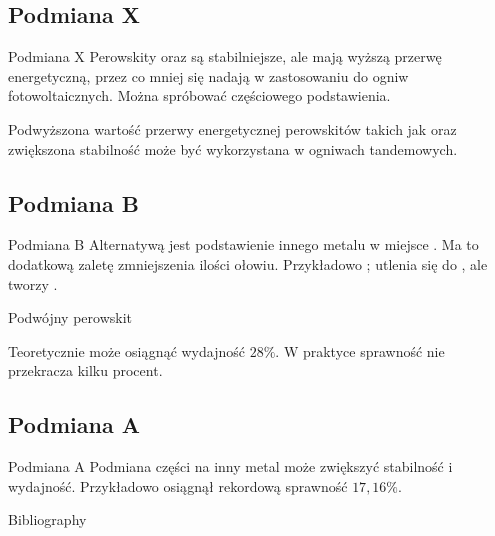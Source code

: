 \documentclass[xcolor]{beamer}
\begin{document}
\subsection{Podmiana X}
\begin{frame}{Podmiana X \cite{miyasaka}}
Perowskity  oraz  są stabilniejsze, ale mają wyższą przerwę energetyczną, przez co mniej się nadają w zastosowaniu do ogniw fotowoltaicznych. Można spróbować częściowego podstawienia.
\begin{center}
\end{center}
Podwyższona wartość przerwy energetycznej perowskitów takich jak  oraz zwiększona stabilność może być wykorzystana w ogniwach tandemowych.
\end{frame}

\subsection{Podmiana B}
\begin{frame}{Podmiana B \cite{miyasaka, ding}}
Alternatywą jest podstawienie innego metalu w miejsce . Ma to dodatkową zaletę zmniejszenia ilości ołowiu. Przykładowo ; utlenia się do , ale tworzy .
\begin{block}{Podwójny perowskit}
\end{block}
Teoretycznie  może osiągnąć wydajność $28\%$. W praktyce sprawność nie przekracza kilku procent.
\end{frame}

\subsection{Podmiana A}
\begin{frame}{Podmiana A \cite{miyasaka}}
Podmiana części  na inny metal może zwiększyć stabilność i wydajność. Przykładowo  osiągnął rekordową sprawność $17,16\%$.
\end{frame}

\begin{frame}{Bibliography}
\printbibliography
\end{frame}
\end{document}
